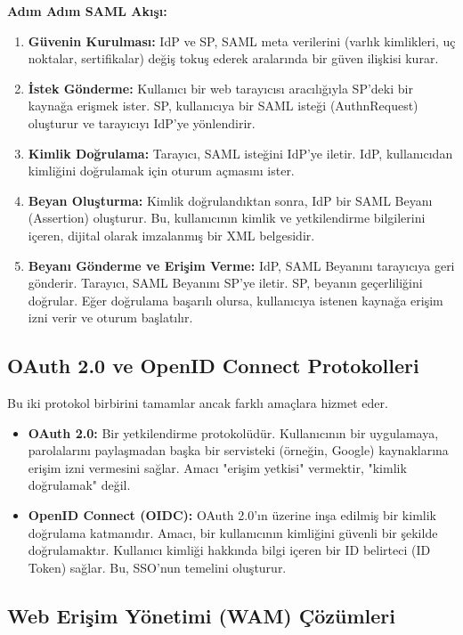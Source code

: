 \textbf{Adım Adım SAML Akışı:}
\begin{enumerate}
    \item \textbf{Güvenin Kurulması:} IdP ve SP, SAML meta verilerini (varlık kimlikleri, uç noktalar, sertifikalar) değiş tokuş ederek aralarında bir güven ilişkisi kurar.
    \item \textbf{İstek Gönderme:} Kullanıcı bir web tarayıcısı aracılığıyla SP'deki bir kaynağa erişmek ister. SP, kullanıcıya bir SAML isteği (AuthnRequest) oluşturur ve tarayıcıyı IdP'ye yönlendirir.
    \item \textbf{Kimlik Doğrulama:} Tarayıcı, SAML isteğini IdP'ye iletir. IdP, kullanıcıdan kimliğini doğrulamak için oturum açmasını ister.
    \item \textbf{Beyan Oluşturma:} Kimlik doğrulandıktan sonra, IdP bir SAML Beyanı (Assertion) oluşturur. Bu, kullanıcının kimlik ve yetkilendirme bilgilerini içeren, dijital olarak imzalanmış bir XML belgesidir.
    \item \textbf{Beyanı Gönderme ve Erişim Verme:} IdP, SAML Beyanını tarayıcıya geri gönderir. Tarayıcı, SAML Beyanını SP'ye iletir. SP, beyanın geçerliliğini doğrular. Eğer doğrulama başarılı olursa, kullanıcıya istenen kaynağa erişim izni verir ve oturum başlatılır.
\end{enumerate}

\subsection{OAuth 2.0 ve OpenID Connect Protokolleri}

Bu iki protokol birbirini tamamlar ancak farklı amaçlara hizmet eder.
\begin{itemize}
    \item \textbf{OAuth 2.0:} Bir yetkilendirme protokolüdür. Kullanıcının bir uygulamaya, parolalarını paylaşmadan başka bir servisteki (örneğin, Google) kaynaklarına erişim izni vermesini sağlar. Amacı "erişim yetkisi" vermektir, "kimlik doğrulamak" değil.
    \item \textbf{OpenID Connect (OIDC):} OAuth 2.0'ın üzerine inşa edilmiş bir kimlik doğrulama katmanıdır. Amacı, bir kullanıcının kimliğini güvenli bir şekilde doğrulamaktır. Kullanıcı kimliği hakkında bilgi içeren bir ID belirteci (ID Token) sağlar. Bu, SSO'nun temelini oluşturur.
\end{itemize}

\subsection{Web Erişim Yönetimi (WAM) Çözümleri}

